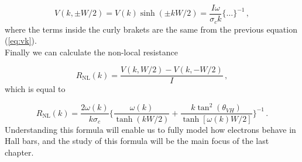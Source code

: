 \begin{equation}
    V(k,\pm W/2)=V(k)\sinh(\pm kW/2)=\frac{I\omega}{\sigma_c k}\bigg\{\dots\bigg\}^{-1}\,,
\end{equation}
where the terms inside the curly brakets are the same from the previous equation (\ref{eq:vk}).\\
Finally we can calculate the non-local resistance

\begin{equation}
    R_\textrm{NL}(k)=\frac{V(k,W/2)-V(k,-W/2)}I\,,
\end{equation}
which is equal to

\begin{equation}
    R_\textrm{NL}(k)=\frac{2\omega(k)}{k\sigma_c}
    \bigg\{
        \frac{\omega(k)}{\tanh(kW/2)} + \frac{k\tan^2(\theta_{VH})}{\tanh[\omega(k)W/2]}    
    \bigg\}^{-1}\,.
   \label{eq:fre-response-beconcini}
\end{equation}
Understanding this formula will enable us to fully model how electrons behave in Hall bars, and the study of this formula will be the main focus of the last chapter.


